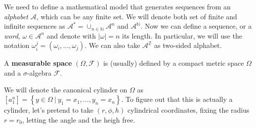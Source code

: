 We need to define a mathematical model that generates sequences from an \emph{alphabet} $\mathcal{A}$, which can be any finite set.
We will denote both set of finite and infinite sequences as $\mathcal{A}^{*} = \cup_{n \in \mathbb{N}} \mathcal{A}^n$ and $\mathcal{A}^\mathbb{N}$.
Now we can define a sequence, or a \emph{word}, $\omega \in \mathcal{A}^n$ and denote with $\left\lvert \omega \right\rvert = n$ its length.
In particular, we will use the notation $\omega_i^j = \left(\omega_i, \ldots, \omega_j\right)$.
We can also take $\mathcal{A}^\mathbb{Z}$ as two-sided alphabet.

\begin{definition}
    A \textbf{measurable space} $\left(\Omega, \mathcal{F}\right)$ is (usually) defined by a compact metric space $\Omega$ and a $\sigma$-algebra $\mathcal{F}$.
\end{definition}

We will denote the canonical cylinder on $\Omega$ as $\left[a_1^n\right] = \left\{y \in \Omega \ \vert \ y_1 = x_1, \ldots, y_n = x_n\right\}$.
To figure out that this is actually a cylinder, let's pretend to take $\left(r, \phi, h\right)$ cylindrical coordinates, fixing the radius $r = r_0$, letting the angle and the heigh free.

